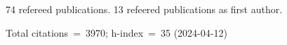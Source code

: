 74 refereed publications. 13 refeered publications as first author.

Total citations~=~3970; h-index~=~35 (2024-04-12)